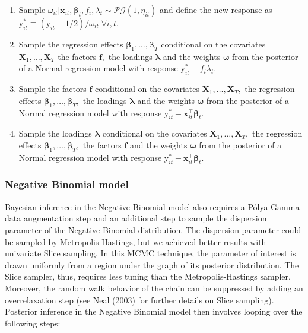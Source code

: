 \documentclass[a4paper, preprint, 3p,
authoryear]{elsarticle} %
\begin{document}
\begin{enumerate}
    \item Sample $\omega_{it}|\textbf{x}_{it},\boldsymbol{\beta}_t,f_i,\lambda_t \sim \mathcal{PG}(1, \eta_{it})$ and define the new response as $\text{y}_{it}^* \equiv (\text{y}_{it}-1/2)/\omega_{it}\; \forall i,t$.
    \item Sample the regression effects $\boldsymbol{\beta}_1,\dots,\boldsymbol{\beta}_T$ conditional on the covariates $\textbf{X}_1,\dots,\textbf{X}_T$ the factors $\mathbf{f},$ the loadings $\boldsymbol{\lambda}$ and the weights $\boldsymbol{\omega}$ from the posterior of a Normal regression model with response $\text{y}_{it}^*-f_i\lambda_t.$
    \item Sample the factors $\mathbf{f}$ conditional on the covariates $\textbf{X}_1,\dots,\textbf{X}_T,$ the regression effects $\boldsymbol{\beta}_1,\dots,\boldsymbol{\beta}_T,$ the loadings $\boldsymbol{\lambda}$ and the weights $\boldsymbol{\omega}$ from the posterior of a Normal regression model with response  $\text{y}_{it}^*-\textbf{x}_{it}^\top \boldsymbol{\beta}_t$.
    \item Sample the loadings $\boldsymbol{\lambda}$ conditional on the covariates $\textbf{X}_1,\dots,\textbf{X}_T,$ the regression effects $\boldsymbol{\beta}_1,\dots,\boldsymbol{\beta}_T,$ the factors $\mathbf{f}$ and the weights $\boldsymbol{\omega}$ from the posterior of a Normal regression model with response  $\text{y}_{it}^*-\textbf{x}_{it}^\top \boldsymbol{\beta}_t.$
\end{enumerate}

\subsubsection{Negative Binomial model}\label{negative-binomial-model}

Bayesian inference in the Negative Binomial model also requires a
Pólya-Gamma data augmentation step and an additional step to sample the
dispersion parameter of the Negative Binomial distribution. The
dispersion parameter could be sampled by Metropolis-Hastings, but we
achieved better results with univariate Slice sampling. In this MCMC
technique, the parameter of interest is drawn uniformly from a region
under the graph of its posterior distribution. The Slice sampler, thus,
requires less tuning than the Metropolis-Hastings sampler. Moreover, the
random walk behavior of the chain can be suppressed by adding an
overrelaxation step (see Neal (2003) for further details on Slice
sampling). Posterior inference in the Negative Binomial model then
involves looping over the following steps:
\end{document}
